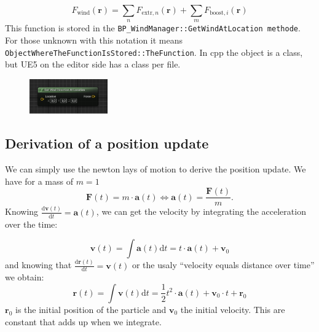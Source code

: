 \documentclass[../main.tex]{subfile}
\begin{document}
    \begin{equation}
        F_{\text{wind}}(\bm{r}) = \sum_n F_{\text{extr},n}(\bm{r}) + \sum_m F_{\text{boost},i}(\bm{r})
    \end{equation}
    This function is stored in the \texttt{BP\_WindManager::GetWindAtLocation methode}. For those unknown with this notation it means
    \texttt{ObjectWhereTheFunctionIsStored::TheFunction}. In cpp the object is a class, but UE5 on the editor side has a class per file.
    \begin{figure}[H]
        \centering
        \includegraphics[width=0.3\textwidth]{Ressources/GetWindAtLoc.png}
    \end{figure}
\subsection{Derivation of a position update}
    We can simply use the newton lays of motion to derive the position update. We have for a mass of $m=1$
    \[
        \bm{F}(t) = m\cdot\bm{a}(t) \Leftrightarrow \bm{a}(t) = \frac{\bm{F}(t)}{m}.
    \]
    Knowing $\frac{\text{d}\bm{v}(t)}{\text{d}t} = \bm{a}(t)$, we can get the velocity by integrating the acceleration over the time:

    \[
        \bm{v}(t) = \int \bm{a}(t)\text{d}t = t\cdot\bm{a}(t) + \bm{v}_0
    \]
    and knowing that $\frac{\text{d}\bm{r}(t)}{\text{d}t} = \bm{v}(t)$ or the usaly ``velocity equals distance over time'' we obtain:
    \begin{equation}\label{eq:position}
        \bm{r}(t) = \int \bm{v}(t)\text{d}t = \frac{1}{2}t^2\cdot\bm{a}(t) + \bm{v}_0\cdot t + \bm{r}_0
    \end{equation}
    $\bm{r}_0$ is the initial position of the particle and $\bm{v}_0$ the initial velocity. This are constant that adds up when we integrate.\\
\end{document}
